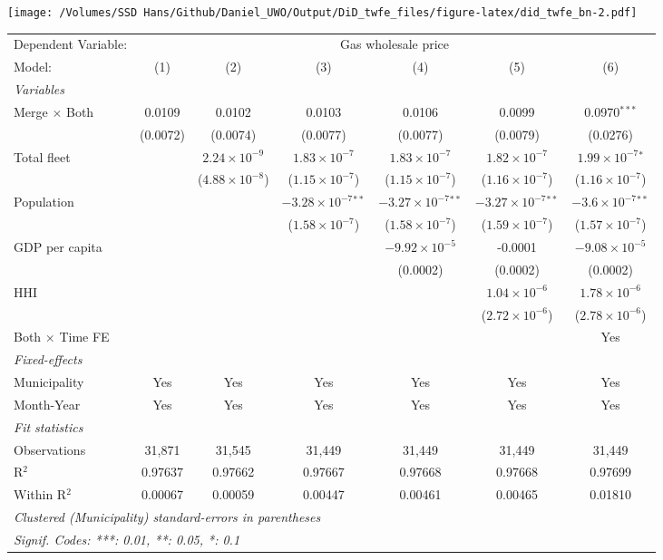 \documentclass[
]{article}
\begin{document}
\texttt{[image: /Volumes/SSD Hans/Github/Daniel\_UWO/Output/DiD\_twfe\_files/figure-latex/did\_twfe\_bn-2.pdf]}

\begin{tabular}{lcccccc}
\tabularnewline\midrule\midrule
Dependent Variable:&\multicolumn{6}{c}{Gas wholesale price}\\
Model:&(1) & (2) & (3) & (4) & (5) & (6)\\
\midrule \emph{Variables}&   &   &   &   &   &  \\
Merge $\times $ Both & 0.0109 & 0.0102 & 0.0103 & 0.0106 & 0.0099 & 0.0970$^{***}$\\
  &(0.0072) & (0.0074) & (0.0077) & (0.0077) & (0.0079) & (0.0276)\\
Total fleet &    & $2.24\times 10^{-9}$ & $1.83\times 10^{-7}$ & $1.83\times 10^{-7}$ & $1.82\times 10^{-7}$ & $1.99\times 10^{-7}$$^{*}$\\
  &   & ($4.88\times 10^{-8}$) & ($1.15\times 10^{-7}$) & ($1.15\times 10^{-7}$) & ($1.16\times 10^{-7}$) & ($1.16\times 10^{-7}$)\\
Population &    &    & $-3.28\times 10^{-7}$$^{**}$ & $-3.27\times 10^{-7}$$^{**}$ & $-3.27\times 10^{-7}$$^{**}$ & $-3.6\times 10^{-7}$$^{**}$\\
  &   &    & ($1.58\times 10^{-7}$) & ($1.58\times 10^{-7}$) & ($1.59\times 10^{-7}$) & ($1.57\times 10^{-7}$)\\
GDP per capita &    &    &    & $-9.92\times 10^{-5}$ & -0.0001 & $-9.08\times 10^{-5}$\\
  &   &    &    & (0.0002) & (0.0002) & (0.0002)\\
HHI &    &    &    &    & $1.04\times 10^{-6}$ & $1.78\times 10^{-6}$\\
  &   &    &    &    & ($2.72\times 10^{-6}$) & ($2.78\times 10^{-6}$)\\
Both $\times$ Time FE &  &  &  &  &  & Yes\\
\midrule \emph{Fixed-effects}&   &   &   &   &   &  \\
Municipality & Yes & Yes & Yes & Yes & Yes & Yes\\
Month-Year & Yes & Yes & Yes & Yes & Yes & Yes\\
\midrule \emph{Fit statistics}&  & & & & & \\
Observations & 31,871&31,545&31,449&31,449&31,449&31,449\\
R$^2$ & 0.97637&0.97662&0.97667&0.97668&0.97668&0.97699\\
Within R$^2$ & 0.00067&0.00059&0.00447&0.00461&0.00465&0.01810\\
\midrule\midrule\multicolumn{7}{l}{\emph{Clustered (Municipality) standard-errors in parentheses}}\\
\multicolumn{7}{l}{\emph{Signif. Codes: ***: 0.01, **: 0.05, *: 0.1}}\\
\end{tabular}
\end{document}
